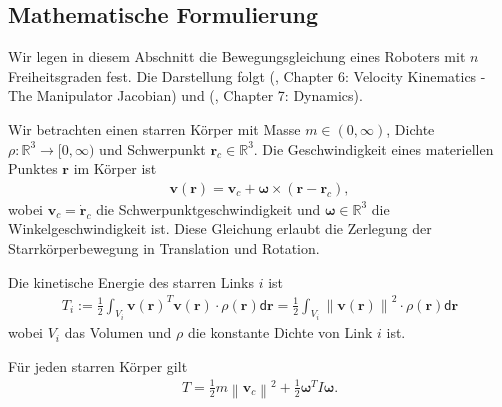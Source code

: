 \documentclass[a4paper, 12pt]{scrartcl}
\newcommand{\norm}[1]{\left\lVert#1\right\lVert}
\begin{document}
\subsection{Mathematische Formulierung}

Wir legen in diesem Abschnitt die Bewegungsgleichung eines Roboters
mit $n$ Freiheitsgraden fest. 
Die Darstellung folgt
(\cite{spong2004}, Chapter 6: Velocity Kinematics - The Manipulator Jacobian) 
und (\cite{siciliano2010}, Chapter 7: Dynamics).


Wir betrachten einen starren Körper mit Masse $m \in (0,\infty)$,
Dichte $\rho : \mathbb{R}^3 \to [0,\infty)$ und Schwerpunkt
$\bm{r}_c \in \mathbb{R}^3$. Die Geschwindigkeit eines materiellen
Punktes $\bm{r}$ im Körper ist
\begin{align*}
    \bm{v}(\bm{r})
    =
    \bm{v}_c + \bm{\omega} \times (\bm{r} - \bm{r}_c),
\end{align*}
%
wobei $\bm{v}_c = \bm{\dot{r}}_c$ die Schwerpunktgeschwindigkeit und
$\bm{\omega} \in \mathbb{R}^3$ die Winkelgeschwindigkeit ist.
%
Diese Gleichung erlaubt die Zerlegung der
Starrkörperbewegung in Translation und Rotation.%

\begin{definition}%
    Die kinetische Energie des starren Links $i$ ist 
    \begin{align*}
        T_i 
        := 
        \frac{1}{2} 
        \int_{V_i} \bm{v}(\bm{r})^T \bm{v}(\bm{r}) \cdot \rho(\bm{r}) \mathsf{d}\bm{r}
        =
        \frac{1}{2} 
        \int_{V_i} \norm{\bm{v}(\bm{r})}^2 \cdot \rho(\bm{r}) \mathsf{d}\bm{r}
    \end{align*}
    wobei $V_i$ das Volumen und $\rho$ die konstante Dichte von Link $i$ ist.
\end{definition}


\begin{satz}%
    \label{kinetische_Energie_Zerlegung}
    Für jeden starren Körper gilt
    \begin{align*}
        T 
        = 
        \frac{1}{2} m \norm{\bm{v}_c}^2
        + 
        \frac{1}{2} \bm{\omega}^T I \bm{\omega}.
    \end{align*}
\end{satz}
\end{document}

